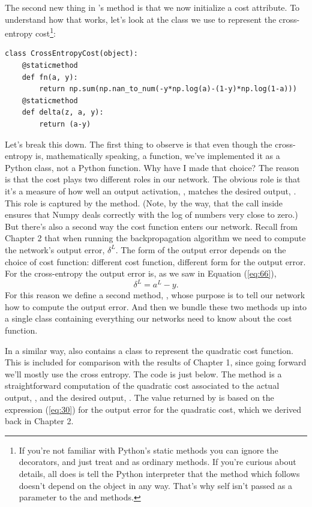 \documentclass[a4paper,twoside,10pt]{book}
\begin{document}
The second new thing in 's  method is that we now initialize a cost attribute. To understand how that works, let's look at the class we use to represent the cross-entropy cost\footnote{If you're not familiar with Python's static methods you can ignore the  decorators, and just treat  and  as ordinary methods. If you're curious about details, all  does is tell the Python interpreter that the method which follows doesn't depend on the object in any way. That's why self isn't passed as a parameter to the  and  methods.}:
\begin{lstlisting} 
class CrossEntropyCost(object):
	@staticmethod
	def fn(a, y):
		return np.sum(np.nan_to_num(-y*np.log(a)-(1-y)*np.log(1-a)))
	@staticmethod
	def delta(z, a, y):
		return (a-y)
\end{lstlisting}
Let's break this down. The first thing to observe is that even though the cross-entropy is, mathematically speaking, a function, we've implemented it as a Python class, not a Python function. Why have I made that choice? The reason is that the cost plays two different roles in our network. The obvious role is that it's a measure of how well an output activation, , matches the desired output, . This role is captured by the  method. (Note, by the way, that the  call inside  ensures that Numpy deals correctly with the log of numbers very close to zero.) But there's also a second way the cost function enters our network. Recall from Chapter 2 that when running the backpropagation algorithm we need to compute the network's output error, $\delta^L$. The form of the output error depends on the choice of cost function: different cost function, different form for the output error. For the cross-entropy the output error is, as we saw in Equation (\ref{eq:66}),
\begin{equation}
	\delta^L=a^L-y.\label{eq:99}
\end{equation}
For this reason we define a second method, , whose purpose is to tell our network how to compute the output error. And then we bundle these two methods up into a single class containing everything our networks need to know about the cost function.

In a similar way,  also contains a class to represent the quadratic cost function. This is included for comparison with the results of Chapter 1, since going forward we'll mostly use the cross entropy. The code is just below. The  method is a straightforward computation of the quadratic cost associated to the actual output, , and the desired output, . The value returned by  is based on the expression (\ref{eq:30}) for the output error for the quadratic cost, which we derived back in Chapter 2.
\end{document}
